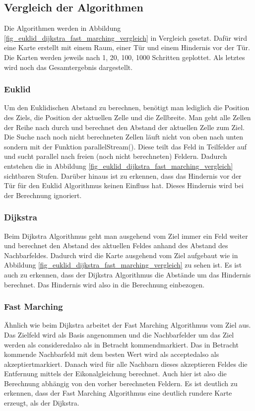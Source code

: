 \subsection{Vergleich der Algorithmen}
Die Algorithmen werden in Abbildung \ref{fig_euklid_dijkstra_fast_marching_vergleich} in Vergleich gesetzt. Dafür wird eine Karte erstellt mit einem Raum, einer Tür und einem Hindernis vor der Tür. Die Karten werden jeweils nach 1, 20, 100, 1000 Schritten geplottet. Als letztes wird noch das Gesamtergebnis dargestellt.

\subsubsection{Euklid}
Um den Euklidischen Abstand zu berechnen, benötigt man lediglich die Position des Ziels, die Position der aktuellen Zelle und die Zellbreite. Man geht alle Zellen der Reihe nach durch und berechnet den Abstand der aktuellen Zelle zum Ziel. Die Suche nach noch nicht berechneten Zellen läuft nicht von oben nach unten sondern mit der Funktion \glqq parallelStream()\grqq . Diese teilt das Feld in Teilfelder auf und sucht parallel nach freien (noch nicht berechneten) Feldern. Dadurch entstehen die in Abbildung \ref{fig_euklid_dijkstra_fast_marching_vergleich} sichtbaren Stufen. \cite{JavaParallelism} Darüber hinaus ist zu erkennen, dass das Hindernis vor der Tür für den Euklid Algorithmus keinen Einfluss hat. Dieses Hindernis wird bei der Berechnung ignoriert.

\subsubsection{Dijkstra}
Beim Dijkstra Algorithmus geht man ausgehend vom Ziel immer ein Feld weiter und berechnet den Abstand des aktuellen Feldes anhand des Abstand des Nachbarfeldes. Dadurch wird die Karte ausgehend vom Ziel aufgebaut wie in Abbildung \ref{fig_euklid_dijkstra_fast_marching_vergleich} zu sehen ist. Es ist auch zu erkennen, dass der Dijkstra Algorithmus die Abstände um das Hindernis berechnet. Das Hindernis wird also in die Berechnung einbezogen.

\subsubsection{Fast Marching}
Ähnlich wie beim Dijkstra arbeitet der Fast Marching Algorithmus vom Ziel aus. Das Zielfeld wird als Basis angenommen und die Nachbarfelder um das Ziel werden als \glqq considered\grqq  also als \glqq in Betracht kommend\grqq  markiert. Das in Betracht kommende Nachbarfeld mit dem besten Wert wird als \glqq accepted\grqq  also als \glqq akzeptiert\grqq  markiert. Danach wird für alle Nachbarn dieses akzeptieren Feldes die Entfernung mittels der Eikonalgleichung berechnet. Auch hier ist also die Berechnung abhängig von den vorher berechneten Feldern. Es ist deutlich zu erkennen, dass der Fast Marching Algorithmus eine deutlich rundere Karte erzeugt, als der Dijkstra.

